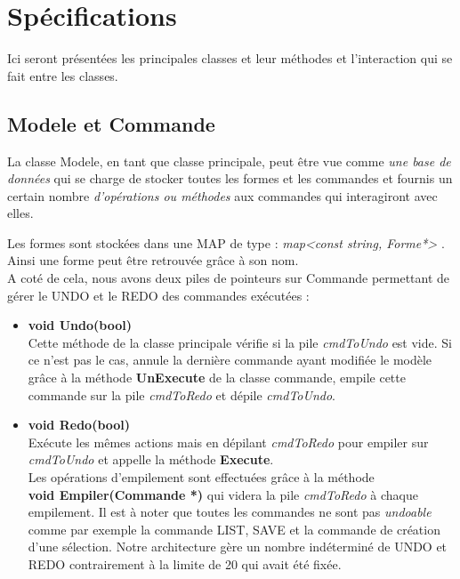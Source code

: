 \documentclass[12pt]{article}
\begin{document}
\section{Spécifications}
Ici seront présentées les principales classes et leur méthodes et l’interaction qui se fait entre les classes.
\subsection{Modele et Commande}
La classe Modele, en tant que classe principale, peut être vue comme \textit{ une base de données} qui se charge de stocker toutes les formes et les commandes et fournis un certain nombre \textit{ d’opérations ou méthodes } aux commandes qui interagiront avec elles. 

Les formes sont stockées dans une MAP de type : \textit{ map<const string, Forme*> }. Ainsi une forme peut être retrouvée grâce à son nom.
\\A coté de cela, nous avons deux piles de pointeurs sur Commande permettant de gérer le UNDO et le REDO des commandes exécutées : 
\newline
\begin{itemize}
\item \textbf{void Undo(bool)}\\
Cette méthode de la classe principale vérifie si la pile \textit{ cmdToUndo} est vide. Si ce n'est pas le cas, annule la dernière commande ayant modifiée le modèle grâce à la méthode \textbf{UnExecute} de la classe commande, empile cette commande sur la pile \textit{cmdToRedo} et dépile \textit{cmdToUndo}.

\item \textbf{void Redo(bool)}\\
Exécute les mêmes actions mais en dépilant	\textit{cmdToRedo} pour empiler sur \textit{cmdToUndo} et appelle la méthode \textbf{Execute}. \\
Les opérations d'empilement sont effectuées grâce à la méthode \\ \textbf{void Empiler(Commande *)} qui videra la pile \textit{cmdToRedo} à chaque empilement. Il est à noter que toutes les commandes ne sont pas \textit{undoable} comme par exemple la commande LIST, SAVE et la commande de création d'une sélection. Notre architecture gère un nombre indéterminé de UNDO et REDO contrairement à la limite de 20 qui avait été fixée.
\end{itemize}
\end{document}
